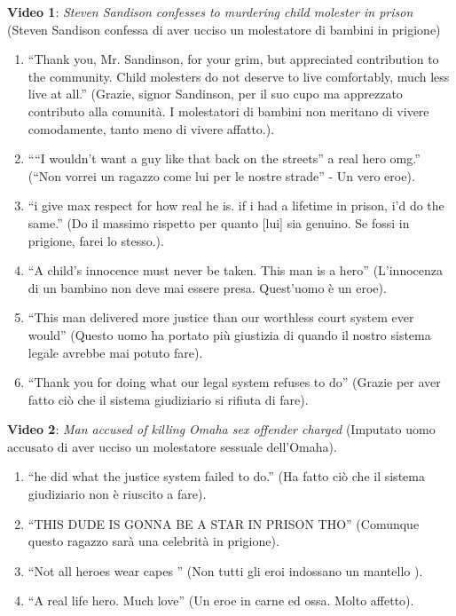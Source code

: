 \documentclass[a4paper, 12pt]{article}
\newcommand{\quotes}[1]{``#1''}
\begin{document}
\textbf{Video 1}: \textit{Steven Sandison confesses to murdering child molester in prison}\cite{video1}
(Steven Sandison confessa di aver ucciso un molestatore di bambini in prigione)
\begin{enumerate}
    \item \enquote{Thank you, Mr. Sandinson, for your grim, but appreciated contribution to the community. Child molesters do not deserve to live comfortably, much less live at all.}
        (Grazie, signor Sandinson, per il suo cupo ma apprezzato contributo alla comunità. I molestatori di bambini non meritano di vivere comodamente, tanto meno di vivere affatto.).
    \item \enquote{“I wouldn’t want a guy like that back on the streets” a real hero omg.}
        (\quotes{Non vorrei un ragazzo come lui per le nostre strade} - Un vero eroe).
    \item \enquote{i give max respect for how real he is. if i had a lifetime in prison, i’d do the same.}
        (Do il massimo rispetto per quanto [lui] sia genuino. Se fossi in prigione, farei lo stesso.).
    \item \enquote{A child’s innocence must never be taken. This man is a hero}
        (L'innocenza di un bambino non deve mai essere presa. Quest'uomo è un eroe).
    \item \enquote{This man delivered more justice than our worthless court system ever would}
        (Questo uomo ha portato più giustizia di quando il nostro sistema legale avrebbe mai potuto fare).
    \item \enquote{Thank you for doing what our legal system refuses to do}
        (Grazie per aver fatto ciò che il sistema giudiziario si rifiuta di fare).
\end{enumerate}

\textbf{Video 2}: \textit{Man accused of killing Omaha sex offender charged}\cite{video2}
(Imputato uomo accusato di aver ucciso un molestatore sessuale dell'Omaha).
\begin{enumerate}
    \item \enquote{he did what the justice system failed to do.}
        (Ha fatto ciò che il sistema giudiziario non è riuscito a fare).
    \item \enquote{THIS DUDE IS GONNA BE A STAR IN PRISON THO}
        (Comunque questo ragazzo sarà una celebrità in prigione).
    \item \enquote{Not all heroes wear capes }
        (Non tutti gli eroi indossano un mantello ).
    \item \enquote{A real life hero. Much love}
        (Un eroe in carne ed ossa. Molto affetto).
\end{enumerate}
\end{document}
